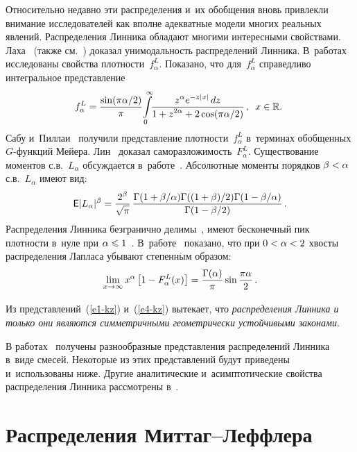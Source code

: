 \begin{multicols}{2}
Относительно недавно эти распределения и~их обобщения вновь
привлекли внимание исследователей как вполне адекватные модели
многих реальных явлений. Распределения Линника обладают многими
интересными свойствами. Лаха~\cite{Laha1961} (также см.~\cite{Lukacs1970}) 
доказал унимодальность распределений Линника. 
В~работах \cite{KotzOstrovskiiHayfavi1995a, KotzOstrovskiiHayfavi1995b} исследованы 
свойства плотности~$f_{\alpha}^{L}$. Показано, что для~$f_{\alpha}^{L}$ справедливо
интегральное представление
\begin{equation}
\hspace*{-2mm}f_{\alpha}^{L}=\fr{\sin(\pi\alpha/2)}{\pi}\!
\int\limits_{0}^{\infty}\!\!\fr{z^{\alpha}e^{-z|x|}\,dz}{1+z^{2\alpha}+2\cos(\pi\alpha/2)}\,,\enskip
x\in\mathbb{R}.\!\!\label{e7-kz}
\end{equation}
Сабу и~Пиллаи~\cite{SabuPillai1987} получили представление плотности~$f_{\alpha}^{L}$ 
в~терминах обобщенных $G$-функ\-ций Мейера. Лин~\cite{Lin1994} 
доказал саморазложимость~$F_{\alpha}^{L}$.
Существо\-вание моментов с.в.~$L_{\alpha}$ обсуждается в~работе~\cite{Anderson1992}. 
Абсолютные моменты порядков $\beta\hm<\alpha$ с.в.~$L_{\alpha}$ имеют вид:
$$
{\sf E}|L_{\alpha}|^{\beta}=\displaystyle\frac{\displaystyle 2^{\beta}\mathstrut}{\displaystyle \sqrt{\pi}\mathstrut}\,
\displaystyle\frac{\displaystyle \Gamma(1+{\beta}/{\alpha})
\Gamma(({1+\beta})/{2})\Gamma(1-{\beta}/{\alpha})\mathstrut}{\displaystyle \Gamma(1-{\beta}/{2})\mathstrut}\,.
$$
Распределения Линника безгранично делимы~\cite{Devroye1990}, имеют
бесконечный пик плотности в~нуле при $\alpha\hm\leqslant1$~\cite{Devroye1990}. 
В~работе~\cite{Jacquesetal1999} показано, что
при $0\hm<\alpha\hm<2$ хвосты распределения Лапласа убывают степенн$\acute{\mbox{ы}}$м
образом:
$$
\lim\limits_{x\to\infty}x^{\alpha}
\left[1-F^{L}_{\alpha}(x)\right]=\displaystyle\frac{\displaystyle \Gamma(\alpha)\mathstrut}{\displaystyle \pi\mathstrut}\sin\displaystyle\frac{\displaystyle \pi\alpha\mathstrut}{\displaystyle 2\mathstrut}\,.
$$

Из представлений~(\ref{e1-kz}) и~(\ref{e4-kz}) вытекает, что \textit{распределения Линника
и только они являются симметричными геометрически устойчивыми
законами}.

В работах~\cite{KorolevZeifman2016a,
KorolevZeifman2016b, KotzOstrovskii1996, Pakes1998} получены разнообразные представления
распределений Линника в~виде смесей. Некоторые из этих представлений
будут приведены и~использованы ниже. Другие аналитические 
и~асимптотические свойства распределения Линника рассмотрены 
в~\cite{KotzOstrovskiiHayfavi1995a, KotzOstrovskiiHayfavi1995b}.

\section{Распределения Миттаг--Леффлера}


\end{multicols}
